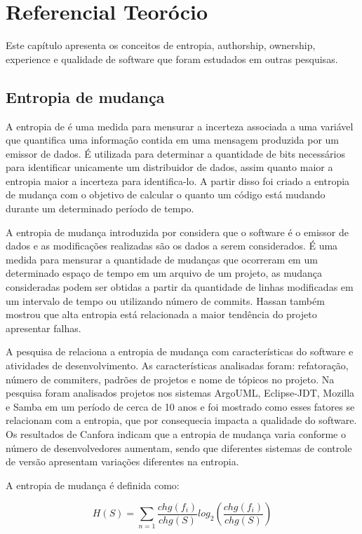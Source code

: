 \chapter{Referencial Teorócio}
Este capítulo apresenta os conceitos de entropia, authorship, ownership, experience e qualidade de software que foram estudados em outras pesquisas.

\section{Entropia de mudança}
A entropia de  é uma medida para mensurar a incerteza associada a uma variável que quantifica uma informação contida em uma mensagem produzida por um emissor de dados. É utilizada para determinar a quantidade de bits necessários para identificar unicamente um distribuidor de dados, assim quanto maior a entropia maior a incerteza para identifica-lo. A partir disso foi criado a entropia de mudança com o objetivo de calcular o quanto um código está mudando durante um determinado período de tempo. 

A entropia de mudança introduzida por  considera que o software é o emissor de dados e as modificações realizadas são os dados a serem considerados. É uma medida para mensurar a quantidade de mudanças que ocorreram em um determinado espaço de tempo em um arquivo de um projeto, as mudança consideradas podem ser obtidas a partir da quantidade de linhas modificadas em um intervalo de tempo ou utilizando número de commits. Hassan também mostrou que alta entropia está relacionada a maior tendência do projeto apresentar falhas.

A pesquisa de  relaciona a entropia de mudança com características do software e atividades de desenvolvimento. As características analisadas foram: refatoração, número de commiters, padrões de projetos e nome de tópicos no projeto. Na pesquisa foram analisados projetos nos sistemas ArgoUML, Eclipse-JDT, Mozilla e Samba em um período de cerca de 10 anos e foi mostrado como esses fatores se relacionam com a entropia, que por consequecia impacta a qualidade do software. Os resultados de Canfora indicam que a entropia de mudança varia conforme o número de desenvolvedores aumentam, sendo que diferentes sistemas de controle de versão apresentam variações diferentes na entropia.

A entropia de mudança é definida como:

\begin{equation}
H(S) = {\sum\limits_{n=1} }\frac{chg(f_i)}{chg(S)}log_2(\frac{chg(f_i)}{chg(S)})
\end{equation}


